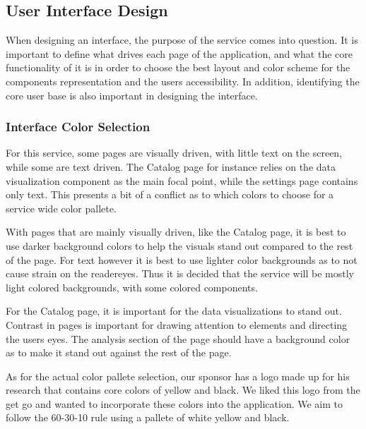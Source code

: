 \subsection{User Interface Design}
When designing an interface, the purpose of the service comes into question. It is important to define what drives each page of the application, and what the core functionality of it is in order to choose the best layout and color scheme for the component\textquotesingle s representation and the user\textquotesingle s accessibility. In addition, identifying the core user base is also important in designing the interface.

\subsubsection{Interface Color Selection}
For this service, some pages are visually driven, with little text on the screen, while some are text driven. The Catalog page for instance relies on the data visualization component as the main focal point, while the settings page contains only text. This presents a bit of a conflict as to which colors to choose for a service wide color pallete.\par
With pages that are mainly visually driven, like the Catalog page, it is best to use darker background colors to help the visuals stand out compared to the rest of the page. For text however it is best to use lighter color backgrounds as to not cause strain on the reader\textquotesingle eyes. Thus it is decided that the service will be mostly light colored backgrounds, with some colored components.\par
For the Catalog page, it is important for the data visualizations to stand out. Contrast in pages is important for drawing attention to elements and directing the user\textquotesingle s eyes. The analysis section of the page should have a background color as to make it stand out against the rest of the page.\par
As for the actual color pallete selection, our sponsor has a logo made up for his research that contains core colors of yellow and black. We liked this logo from the get go and wanted to incorporate these colors into the application. We aim to follow the 60-30-10 rule using a pallete of white yellow and black.

